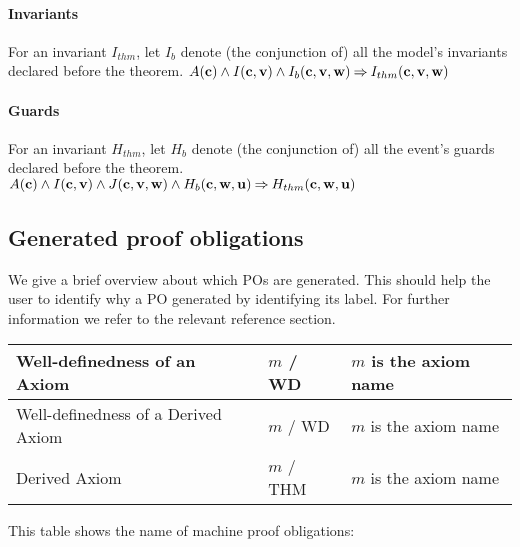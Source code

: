 \paragraph{Invariants}
\label{invariants_as_theorems}
For an invariant $I_{thm}$, 
  let $I_b$ denote (the conjunction of) all the model's 
  invariants declared before the theorem.
%
  {$A(\mathbf{c}) \land I(\mathbf{c},\mathbf{v}) \land I_b(\mathbf{c},\mathbf{v},\mathbf{w})
    \mathbin\Rightarrow I_{thm}(\mathbf{c},\mathbf{v},\mathbf{w})$}

\paragraph{Guards}
\label{guards_as_theorems}
For an invariant $H_{thm}$, 
  let $H_b$ denote (the conjunction of) all the event's 
  guards declared before the theorem.
%
  {$A(\mathbf{c}) \land I(\mathbf{c},\mathbf{v}) \land J(\mathbf{c},\mathbf{v},\mathbf{w}) \land
    H_b(\mathbf{c},\mathbf{w},\mathbf{u}) 
    \mathbin\Rightarrow H_{thm}(\mathbf{c},\mathbf{w},\mathbf{u})$}

\subsection{Generated proof obligations}
\label{generated_proof_obligations}

We give a brief overview about which POs are generated.
This should help the user to identify why a PO generated by identifying its label.
For further information we refer to the relevant reference section.

\begin{center}
    \begin{tabular}{| p{6cm} | p{3cm} | p{5cm} |}
    \hline
	Well-definedness of an Axiom & $m$ / WD & $m$ is the axiom name\\ \hline
	Well-definedness of a Derived Axiom & $m$  / WD & $m$ is the axiom name \\ \hline
	Derived Axiom & $m$  / THM & $m$ is the axiom name \\ \hline
    \end{tabular}
\end{center}

This table shows the name of machine proof obligations:

